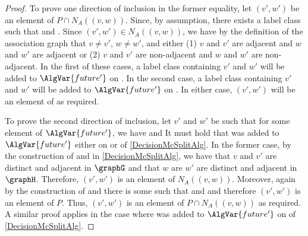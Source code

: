 \begin{proof}
    To prove one direction of inclusion in the former equality, let $(v',w')$
    be an element of $P \cap N_A((v,w))$.  Since, by assumption,
    there exists
    a label class
    such that
    and
    .
    Since $(v',w') \in N_A((v,w))$, we have
    by the definition of the association graph that $v
    \not= v'$, $w \not= w'$, and either (1) $v$ and $v'$ are adjacent and $w$
    and $w'$ are adjacent or (2) $v$ and $v'$ are non-adjacent and $w$ and $w'$
    are non-adjacent.  In the first of these cases, a label class containing
    $v'$ and $w'$ will be added to $\AlgVar{future'}$ on
    .  In the second case, a label class
    containing $v'$ and $w'$ will be added to $\AlgVar{future'}$ on
    . In either case, $(v',w')$ will be an
    element of
    as required.

    To prove the second direction of inclusion, let $v'$ and $w'$ be such that for
    some element
    of $\AlgVar{future'}$, we have
    and
    It must hold that 
    was added to $\AlgVar{future'}$ either on
     or  of
    \cref{DecisionMcSplitAlg}. In the former case, by the construction of
    and
    in \cref{DecisionMcSplitAlg}, we have that $v$ and $v'$ are distinct and adjacent
    in $\graphG$ and that $w$ are $w'$ are distinct and adjacent in $\graphH$.
    Therefore, $(v',w')$ is an element
    of $N_A((v,w))$.
    Moreover, again by the construction of
    and
    there is some
    such that
    and
    and
    therefore $(v',w')$ is an element of $P$.
    Thus, $(v',w')$ is an element of $P \cap N_A((v,w))$ as required.
    A similar proof applies in the case where
    was added to $\AlgVar{future'}$ on
     of \cref{DecisionMcSplitAlg}.


\end{proof}
